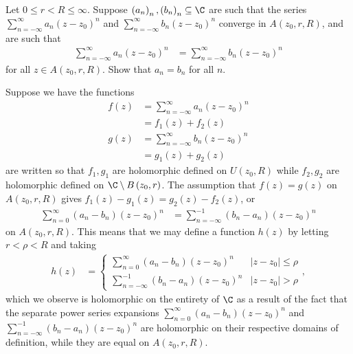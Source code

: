 \documentclass[11pt]{mypackage}
\begin{document}
\RaggedRight

\begin{problem}[Problem 1]
  Let $0\leq r < R \leq \infty$. Suppose $\left( a_n \right)_n,\left( b_n \right)_n\subseteq \C$ are such that the series $\sum_{n=-\infty}^{\infty}a_n\left( z-z_0 \right)^{n}$ and $\sum_{n=-\infty}^{\infty}b_n\left( z-z_0 \right)^{n}$ converge in $A\left( z_0,r,R \right)$, and are such that
  \begin{align*}
    \sum_{n=-\infty}^{\infty} a_n\left( z-z_0 \right)^{n} &= \sum_{n=-\infty}^{\infty}b_n\left( z-z_0 \right)^{n}
  \end{align*}
  for all $z\in A\left( z_0,r,R \right)$. Show that $a_n = b_n$ for all $n$.
\end{problem}
\begin{solution}
  Suppose we have the functions
  \begin{align*}
    f(z) &= \sum_{n=-\infty}^{\infty} a_n\left( z-z_0 \right)^{n}\\
         &= f_1(z) + f_2(z)\\
    g(z) &= \sum_{n=-\infty}^{\infty}b_n\left( z-z_0 \right)^{n}\\
         &= g_1(z) + g_2(z)
  \end{align*}
  are written so that $f_1,g_1$ are holomorphic defined on $U\left( z_0,R \right)$ while $f_2,g_2$ are holomorphic defined on $\C\setminus B\left( z_0,r \right)$. The assumption that $f(z) = g(z)$ on $A\left( z_0,r,R \right)$ gives $f_1(z) - g_1(z) = g_2(z) - f_2(z)$, or
  \begin{align*}
    \sum_{n=0}^{\infty} \left( a_n-b_n \right)\left( z-z_0 \right)^{n} &= \sum_{n=-\infty}^{-1} \left( b_n-a_n \right)\left( z-z_0 \right)^{n}
  \end{align*}
  on $A\left( z_0,r,R \right)$. This means that we may define a function $h(z)$ by letting $r < \rho < R$ and taking
  \begin{align*}
    h(z) &= \begin{cases}
      \sum_{n=0}^{\infty}\left( a_n-b_n \right)\left( z-z_0 \right)^{n} & \left\vert z-z_0 \right\vert\leq \rho\\
      \sum_{n=-\infty}^{-1}\left( b_n-a_n \right)\left( z-z_0 \right)^{n} & \left\vert z-z_0 \right\vert > \rho
    \end{cases},
  \end{align*}
  which we observe is holomorphic on the entirety of $\C$ as a result of the fact that the separate power series expansions $\sum_{n=0}^{\infty}\left( a_n-b_n \right)\left( z-z_0 \right)^{n}$ and $\sum_{n=-\infty}^{-1}\left( b_n-a_n \right)\left( z-z_0 \right)^{n}$ are holomorphic on their respective domains of definition, while they are equal on $A\left( z_0,r,R \right)$.\newline


\end{solution}
\end{document}
